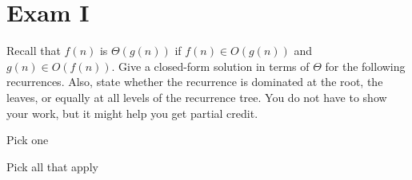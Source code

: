 \chapter{Exam I}
\label{ch:exam1}


\begin{gram}
Recall that $f(n)$ is $\Theta(g(n))$
if $f(n) \in O(g(n))$ and $g(n) \in O(f(n))$.
Give a closed-form
solution in terms of $\Theta$ for the following recurrences.
Also, state whether the recurrence is dominated at the root, the
leaves, or equally at all levels of the recurrence tree.
You do not have to show your work, but it might help you get partial
credit.
\end{gram}




\begin{problem}[10]

Pick one
\begin{pickone}[5]
\end{pickone}
\end{problem}


\begin{problem}[10]

Pick all that apply
\begin{pickany}[5]
\end{pickany}
\end{problem}

